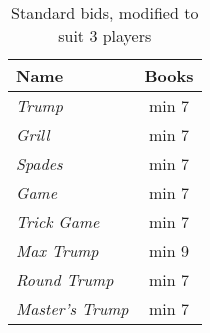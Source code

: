 %
%
%

\begin{table}
	\begin{center}
		\begin{tabular}{ l | c }
				\textbf{Name} & \textbf{Books}
				\\ \hline
				\textit{Trump} & min 7 \\
				\textit{Grill} & min 7 \\
				\textit{Spades} & min 7 \\
				\textit{Game} & min 7 \\
				\textit{Trick Game} & min 7 \\
				\textit{Max Trump} & min 9 \\
				\textit{Round Trump} & min 7 \\
				\textit{Master's Trump} & min 7
		\end{tabular}
	\end{center}
	\caption{Standard bids, modified to suit 3 players}
	\label{tab:standardBids3}
\end{table}
